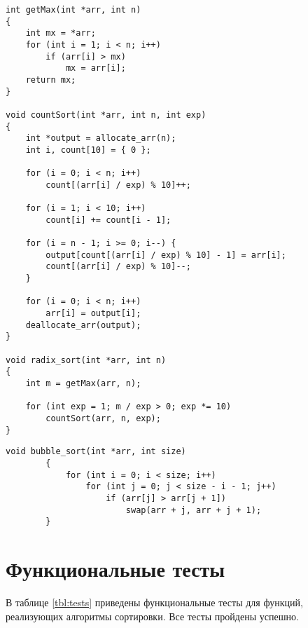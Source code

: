 \begin{center}
\captionsetup{justification=raggedright,singlelinecheck=off}
\begin{lstlisting}[label=lst:radix,caption=Aлгоритм поразрядной сортировки]
int getMax(int *arr, int n)
{
	int mx = *arr;
	for (int i = 1; i < n; i++)
		if (arr[i] > mx)
			mx = arr[i];
	return mx;
}

void countSort(int *arr, int n, int exp)
{
	int *output = allocate_arr(n);
	int i, count[10] = { 0 };
	
	for (i = 0; i < n; i++)
		count[(arr[i] / exp) % 10]++;
	
	for (i = 1; i < 10; i++)
		count[i] += count[i - 1];
	
	for (i = n - 1; i >= 0; i--) {
		output[count[(arr[i] / exp) % 10] - 1] = arr[i];
		count[(arr[i] / exp) % 10]--;
	}
	
	for (i = 0; i < n; i++)
		arr[i] = output[i];
	deallocate_arr(output);
}

void radix_sort(int *arr, int n)
{
	int m = getMax(arr, n);
	
	for (int exp = 1; m / exp > 0; exp *= 10)
		countSort(arr, n, exp);
}
\end{lstlisting}
\end{center}
\clearpage
\begin{center}
	\captionsetup{justification=raggedright,singlelinecheck=off}
	\begin{lstlisting}[label=lst:bubble,caption=Aлгоритма сортировки пузырьком]
		void bubble_sort(int *arr, int size)
		{
			for (int i = 0; i < size; i++)
				for (int j = 0; j < size - i - 1; j++)
					if (arr[j] > arr[j + 1])
						swap(arr + j, arr + j + 1);
		}
	\end{lstlisting} 
\end{center}


\section{Функциональные тесты}

В таблице \ref{tbl:tests} приведены функциональные тесты для функций, реализующих алгоритмы сортировки. Все тесты пройдены успешно.

